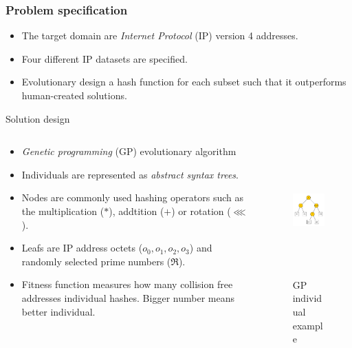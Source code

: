 \documentclass[11pt]{beamer}
\begin{document}
	\begin{frame}
		\frametitle{Problem specification}
		\begin{itemize}[<+->]
				\item The target domain are \textit{Internet Protocol} (IP) version 4 addresses.
				\item Four different IP datasets are specified.
				\item Evolutionary design a hash function for each subset such that it outperforms
					human-created solutions.
		\end{itemize}
	\end{frame}
	\begin{frame}{Solution design}
		\begin{columns}[T]
			\begin{column}{7cm}
			\begin{itemize} [<+->]
				\item \textit{Genetic programming} (GP) evolutionary algorithm
				\item Individuals are represented as \textit{abstract syntax trees}.
				\item Nodes are commonly used hashing operators such as the multiplication ($*$), addtition ($+$) or rotation ($\lll$).
				\item Leafs are IP address octets ($o_0, o_1, o_2, o_3$) and randomly selected prime numbers ($\Re$).
				\item Fitness function measures how many collision free addresses individual hashes. Bigger number means better individual.
			\end{itemize}
			\end{column}
			\begin{column}{5cm}
				\begin{figure}
					\centering
					\includegraphics[height=5cm]{fig/ast_example}
					\caption{GP individual example}
				\end{figure}
			\end{column}
		\end{columns}
	\end{frame}
\end{document}
